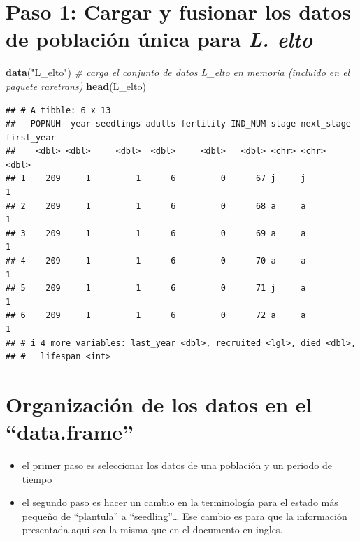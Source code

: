 \documentclass[
]{book}
\newenvironment{Shaded}{\begin{snugshade}}{\end{snugshade}}
\newcommand{\CommentTok}[1]{\textcolor[rgb]{0.56,0.35,0.01}{\textit{#1}}}
\newcommand{\FunctionTok}[1]{\textcolor[rgb]{0.13,0.29,0.53}{\textbf{#1}}}
\newcommand{\NormalTok}[1]{#1}
\newcommand{\StringTok}[1]{\textcolor[rgb]{0.31,0.60,0.02}{#1}}
\providecommand{\tightlist}{%
  \setlength{\itemsep}{0pt}\setlength{\parskip}{0pt}}
\theoremstyle{definition}
\theoremstyle{definition}
\theoremstyle{definition}
\theoremstyle{definition}
\theoremstyle{remark}
\begin{document}
\hypertarget{paso-1-cargar-y-fusionar-los-datos-de-poblaciuxf3n-uxfanica-para-l.-elto}{%
\section{\texorpdfstring{Paso 1: Cargar y fusionar los datos de población única para \emph{L. elto}}{Paso 1: Cargar y fusionar los datos de población única para L. elto}}\label{paso-1-cargar-y-fusionar-los-datos-de-poblaciuxf3n-uxfanica-para-l.-elto}}

\begin{Shaded}
\begin{Highlighting}[]
\FunctionTok{data}\NormalTok{(}\StringTok{"L\_elto"}\NormalTok{) }\CommentTok{\# carga el conjunto de datos \textasciigrave{}L\_elto\textasciigrave{} en memoria (incluido en el paquete \textasciigrave{}raretrans\textasciigrave{})}
\FunctionTok{head}\NormalTok{(L\_elto) }
\end{Highlighting}
\end{Shaded}

\begin{verbatim}
## # A tibble: 6 x 13
##   POPNUM  year seedlings adults fertility IND_NUM stage next_stage first_year
##    <dbl> <dbl>     <dbl>  <dbl>     <dbl>   <dbl> <chr> <chr>           <dbl>
## 1    209     1         1      6         0      67 j     j                   1
## 2    209     1         1      6         0      68 a     a                   1
## 3    209     1         1      6         0      69 a     a                   1
## 4    209     1         1      6         0      70 a     a                   1
## 5    209     1         1      6         0      71 j     a                   1
## 6    209     1         1      6         0      72 a     a                   1
## # i 4 more variables: last_year <dbl>, recruited <lgl>, died <dbl>,
## #   lifespan <int>
\end{verbatim}

\hypertarget{organizaciuxf3n-de-los-datos-en-el-data.frame}{%
\section{Organización de los datos en el ``data.frame''}\label{organizaciuxf3n-de-los-datos-en-el-data.frame}}

\begin{itemize}
\tightlist
\item
  el primer paso es seleccionar los datos de una población y un
  periodo de tiempo
\item
  el segundo paso es hacer un cambio en la terminología para el estado
  más pequeño de ``plantula'' a ``seedling''\ldots{} Ese cambio es para que la
  información presentada aqui sea la misma que en el documento en
  ingles.
\end{itemize}
\end{document}
